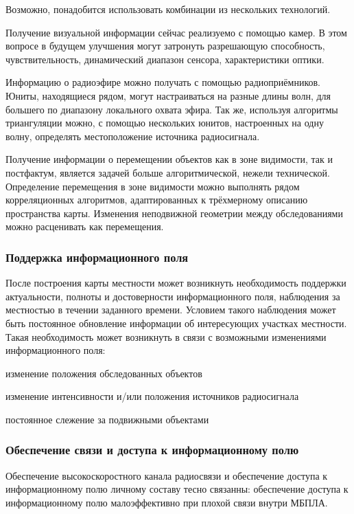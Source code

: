 Возможно, понадобится использовать комбинации из нескольких технологий.

Получение визуальной информации сейчас реализуемо с помощью камер. В этом
вопросе в будущем улучшения могут затронуть разрешающую способность, чувствительность,
динамический диапазон сенсора, характеристики оптики.

Информацию о радиоэфире можно получать с помощью радиоприёмников. Юниты, находящиеся
рядом, могут настраиваться на разные длины волн, для большего по диапазону
локального охвата эфира. Так же, используя алгоритмы триангуляции можно, 
с помощью нескольких юнитов, настроенных на одну волну, определять местоположение
источника радиосигнала.

Получение информации о перемещении объектов как в зоне видимости,
так и постфактум, является задачей больше алгоритмической, нежели технической.
Определение перемещения в зоне видимости можно выполнять рядом корреляционных
алгоритмов, адаптированных к трёхмерному описанию пространства карты.
Изменения неподвижной геометрии между обследованиями можно расценивать как
перемещения.

\subsubsection{Поддержка информационного поля}

После построения карты местности может возникнуть необходимость
поддержки актуальности, полноты и достоверности информационного поля,
наблюдения за местностью в течении заданного времени.
Условием такого наблюдения может быть постоянное обновление информации
об интересующих участках местности. Такая необходимость может возникнуть
в связи с возможными изменениями информационного поля:
\begin{mintemize}
\item изменение положения обследованных объектов 
\item изменение интенсивности и/или положения источников радиосигнала
\item постоянное слежение за подвижными объектами
\end{mintemize}

\subsubsection{Обеспечение связи и доступа к информационному полю}

Обеспечение высокоскоростного канала радиосвязи и обеспечение
доступа к информационному полю личному составу тесно связанны:
обеспечение доступа к информационному полю малоэффективно при
плохой связи внутри МБПЛА.

